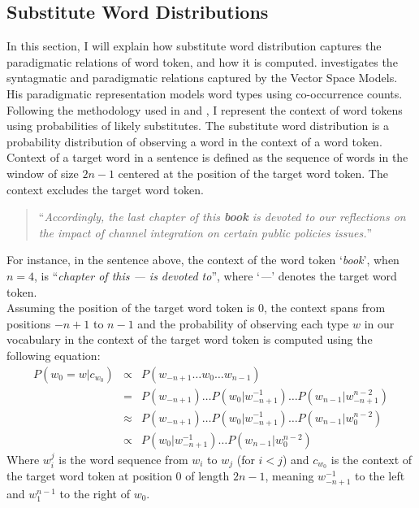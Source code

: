 \subsection{Substitute Word Distributions}
\label{section:subs-dist}

In this section, I will explain how substitute word distribution captures the paradigmatic relations of word token, and how it is computed. \cite{sahlgren2006word} investigates the syntagmatic and paradigmatic relations captured by the Vector Space Models. His paradigmatic representation models word types using co-occurrence counts. Following the methodology used in \citet{yatbaz2012learning} and \citet{yatbaz2012learning}, I represent the context of word tokens using probabilities of likely substitutes. The substitute word distribution is a probability distribution of observing a word in the context of a word token. Context of a target word in a sentence is defined as the sequence of words in the window of size $2n - 1$ centered at the position of the
target word token. The context excludes the target word token. 


\begin{quote}
``\emph{Accordingly, the last chapter of this \textbf{book} is devoted to our reflections on the impact of channel integration on certain public policies issues.}''
\end{quote}


For instance, in the sentence above, the context of the word token `\emph{book}', when $n = 4$, is ``\emph{chapter of this --- is devoted to}'', where `\emph{---}' denotes the target word token. \\

Assuming the position of the target word token is $0$, the context
spans from positions $-n + 1$ to $n - 1$ and the probability of
observing each type $w$ in our vocabulary in the context of the target
word token is computed using the following equation:
\begin{eqnarray}
  P(w_{0} = w | c_{w_{0}}) & \propto & P(w_{-n + 1} \dots w_{0} \dots w_{n - 1}) \label{eq:ngram1} \\
  & = & P(w_{-n + 1}) \dots P(w_{0} | w_{-n + 1}^{-1}) \dots P(w_{n - 1} | w_{-n + 1}^{n - 2}) \label{eq:ngram2} \\
  & \approx & P(w_{-n + 1}) \dots P(w_{0} | w_{-n + 1}^{-1}) \dots P(w_{n - 1} | w_{0}^{n - 2}) \label{eq:ngram3} \\
  & \propto & P(w_{0} | w_{-n + 1}^{-1}) \dots P(w_{n - 1} | w_{0}^{n - 2}) \label{eq:ngram4}
\end{eqnarray}
Where $w_{i}^j$ is the word sequence from $w_i$ to $w_j$ (for $i < j$)
and $c_{w_{0}}$ is the context of the target word token at position
$0$ of length $2n - 1$, meaning $w_{-n+1}^{-1}$ to the left and
$w_{1}^{n-1}$ to the right of $w_{0}$. \\

